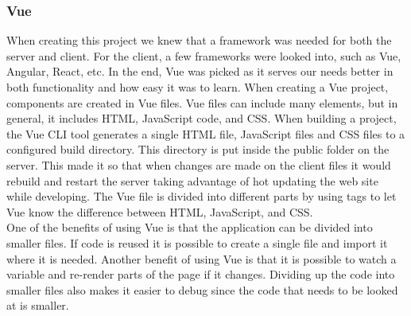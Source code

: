 \subsubsection{Vue}
When creating this project we knew that a framework was needed for both the server and client. For the client, a few frameworks were looked into, such as Vue, Angular\cite{Angular:Info}, React\cite{React:Info}, etc. In the end, Vue was picked as it serves our needs better in both functionality and how easy it was to learn. When creating a Vue project, components are created in Vue files. Vue files can include many elements, but in general, it includes HTML, JavaScript code, and CSS. When building a project, the Vue CLI tool generates a single HTML file, JavaScript files and CSS files to a configured build directory. This directory is put inside the public folder on the server. This made it so that when changes are made on the client files it would rebuild and restart the server taking advantage of hot updating the web site while developing. The Vue file is divided into different parts by using tags to let Vue know the difference between HTML, JavaScript, and CSS.
\\[11pt]
One of the benefits of using Vue is that the application can be divided into smaller files. If code is reused it is possible to create a single file and import it where it is needed. Another benefit of using Vue is that it is possible to watch a variable and re-render parts of the page if it changes. Dividing up the code into smaller files also makes it easier to debug since the code that needs to be looked at is smaller.
\\[11pt]
